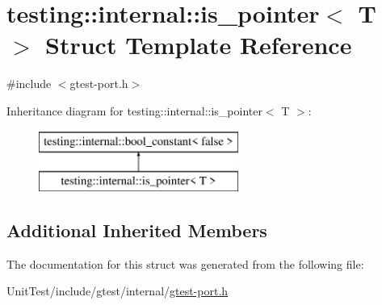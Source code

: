 \hypertarget{structtesting_1_1internal_1_1is__pointer}{\section{testing\+:\+:internal\+:\+:is\+\_\+pointer$<$ T $>$ Struct Template Reference}
\label{structtesting_1_1internal_1_1is__pointer}
}


{\ttfamily \#include $<$gtest-\/port.\+h$>$}

Inheritance diagram for testing\+:\+:internal\+:\+:is\+\_\+pointer$<$ T $>$\+:\begin{figure}[H]
\begin{center}
\leavevmode
\includegraphics[height=2.000000cm]{structtesting_1_1internal_1_1is__pointer}
\end{center}
\end{figure}
\subsection*{Additional Inherited Members}


The documentation for this struct was generated from the following file\+:\begin{DoxyCompactItemize}
\item 
Unit\+Test/include/gtest/internal/\hyperlink{gtest-port_8h}{gtest-\/port.\+h}\end{DoxyCompactItemize}

